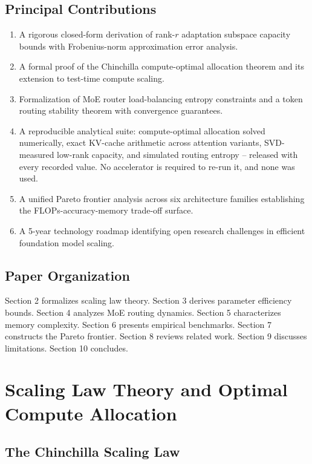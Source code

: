 \documentclass{article}
\begin{document}
\subsection{Principal Contributions}


\begin{enumerate}
  \item A rigorous closed-form derivation of rank-$r$ adaptation subspace capacity bounds with Frobenius-norm approximation error analysis.
  \item A formal proof of the Chinchilla compute-optimal allocation theorem and its extension to test-time compute scaling.
  \item Formalization of MoE router load-balancing entropy constraints and a token routing stability theorem with convergence guarantees.
  \item A reproducible analytical suite: compute-optimal allocation solved numerically, exact KV-cache arithmetic across attention variants, SVD-measured low-rank capacity, and simulated routing entropy -- released with every recorded value. No accelerator is required to re-run it, and none was used.
  \item A unified Pareto frontier analysis across six architecture families establishing the FLOPs-accuracy-memory trade-off surface.
  \item A 5-year technology roadmap identifying open research challenges in efficient foundation model scaling.
\end{enumerate}


\subsection{Paper Organization}


Section 2 formalizes scaling law theory. Section 3 derives parameter efficiency bounds. Section 4 analyzes MoE routing dynamics. Section 5 characterizes memory complexity. Section 6 presents empirical benchmarks. Section 7 constructs the Pareto frontier. Section 8 reviews related work. Section 9 discusses limitations. Section 10 concludes.




\section{Scaling Law Theory and Optimal Compute Allocation}



\subsection{The Chinchilla Scaling Law}
\end{document}
